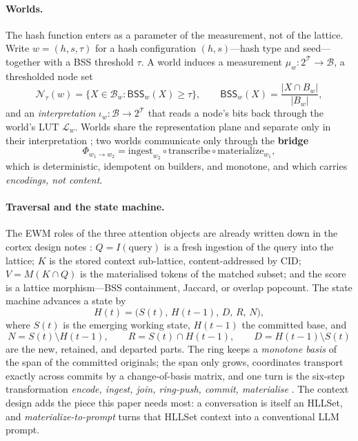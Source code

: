\documentclass[11pt,a4paper]{article}
\theoremstyle{remark}
\newcommand{\Lat}{\ensuremath{\mathcal{B}}}            %
\newcommand{\Tok}{\ensuremath{\mathcal{T}}}            %
\newcommand{\BSS}{\ensuremath{\mathsf{BSS}}}           %
\newcommand{\World}{\ensuremath{w}}                     %
\newcommand{\Lut}{\ensuremath{\mathcal{L}}}             %
\newcommand{\iotaw}{\ensuremath{\iota_{w}}}             %
\newcommand{\Bnd}{\ensuremath{\Phi}}                    %
\begin{document}
\paragraph{Worlds.} The hash function enters as a parameter of the
measurement, not of the lattice. Write $\World=(h,s,\tau)$ for a hash
configuration $(h,s)$---hash type and seed---together with a BSS threshold
$\tau$. A world induces a measurement $\mu_\World:2^{\Tok}\to\Lat$, a
thresholded node set
\begin{equation}
\label{eq:world}
\mathcal{N}_\tau(\World)=\bigl\{X\in\Lat_\World:\BSS_\World(X)\ge\tau\bigr\},
\qquad
\BSS_\World(X)=\frac{|X\cap B_\World|}{|B_\World|},
\end{equation}
and an \emph{interpretation} $\iotaw:\Lat\to2^{\Tok}$ that reads a node's bits
back through the world's LUT $\Lut_\World$. Worlds share the representation
plane and separate only in their interpretation
\cite{companion2026}; two worlds communicate only through the \textbf{bridge}
\begin{equation}
\label{eq:bridge}
\Bnd_{\World_1\to\World_2}
=\mathrm{ingest}_{\World_2}\circ\mathrm{transcribe}\circ\mathrm{materialize}_{\World_1},
\end{equation}
which is deterministic, idempotent on builders, and monotone, and which carries
\emph{encodings, not content}.

\paragraph{Traversal and the state machine.} The EWM roles of the three
attention objects are already written down in the cortex design notes
\cite{kspace2026}: $Q=I(\text{query})$ is a fresh ingestion of the query into
the lattice; $K$ is the stored context sub-lattice, content-addressed by CID;
$V=M(K\cap Q)$ is the materialised tokens of the matched subset; and the score
is a lattice morphism---BSS containment, Jaccard, or overlap popcount. The
state machine \cite{state2026} advances a state by
\begin{equation}
\label{eq:fundamental}
H(t)=\bigl(S(t),\,H(t{-}1),\,D,\,R,\,N\bigr),
\end{equation}
where $S(t)$ is the emerging working state, $H(t{-}1)$ the committed base, and
\begin{equation}
\label{eq:drn}
N=S(t)\setminus H(t{-}1),\qquad
R=S(t)\cap H(t{-}1),\qquad
D=H(t{-}1)\setminus S(t)
\end{equation}
are the new, retained, and departed parts. The ring keeps a \emph{monotone
basis} of the span of the committed originals; the span only grows, coordinates
transport exactly across commits by a change-of-basis matrix, and one turn is
the six-step transformation \emph{encode, ingest, join, ring-push, commit,
materialise} \cite{state2026}. The context design \cite{ctx2026} adds the piece
this paper needs most: a conversation is itself an HLLSet, and
\emph{materialize-to-prompt} turns that HLLSet context into a conventional LLM
prompt.
\end{document}
